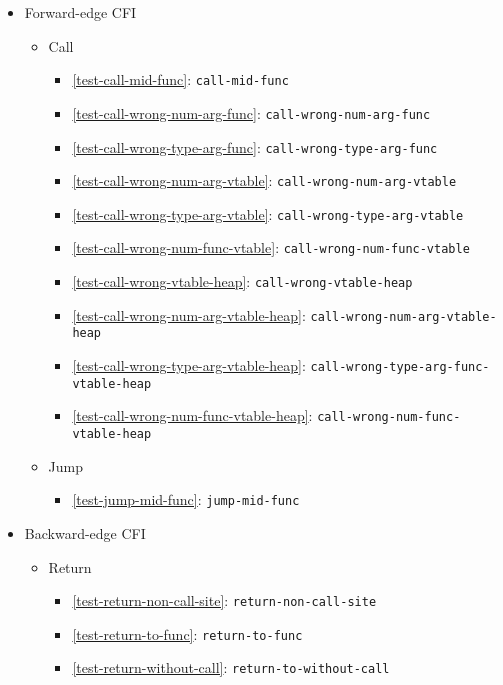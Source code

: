 \documentclass[a4paper]{book}
\begin{document}
\begin{itemize}[noitemsep]
\item Forward-edge CFI
  \begin{itemize}[noitemsep, nolistsep, leftmargin=1em]
  \item Call
    \begin{itemize}[noitemsep, nolistsep, leftmargin=1em]
    \item \ref{test-call-mid-func}: \texttt{call-mid-func}
    \item \ref{test-call-wrong-num-arg-func}: \texttt{call-wrong-num-arg-func}
    \item \ref{test-call-wrong-type-arg-func}: \texttt{call-wrong-type-arg-func}
    \item \ref{test-call-wrong-num-arg-vtable}: \texttt{call-wrong-num-arg-vtable}
    \item \ref{test-call-wrong-type-arg-vtable}: \texttt{call-wrong-type-arg-vtable}
    \item \ref{test-call-wrong-num-func-vtable}: \texttt{call-wrong-num-func-vtable}
    \item \ref{test-call-wrong-vtable-heap}: \texttt{call-wrong-vtable-heap}
    \item \ref{test-call-wrong-num-arg-vtable-heap}: \texttt{call-wrong-num-arg-vtable-heap}
    \item \ref{test-call-wrong-type-arg-vtable-heap}: \texttt{call-wrong-type-arg-func-vtable-heap}
    \item \ref{test-call-wrong-num-func-vtable-heap}: \texttt{call-wrong-num-func-vtable-heap}
    \end{itemize}
  \item Jump
    \begin{itemize}[noitemsep, nolistsep, leftmargin=1em]
    \item \ref{test-jump-mid-func}: \texttt{jump-mid-func}
    \end{itemize}
  \end{itemize}
\item Backward-edge CFI
  \begin{itemize}[noitemsep, nolistsep, leftmargin=1em]
  \item Return
    \begin{itemize}[noitemsep, nolistsep, leftmargin=1em]
    \item \ref{test-return-non-call-site}: \texttt{return-non-call-site}
    \item \ref{test-return-to-func}: \texttt{return-to-func}
    \item \ref{test-return-without-call}: \texttt{return-to-without-call}
    \end{itemize}
  \end{itemize}
\end{itemize}
\end{document}
